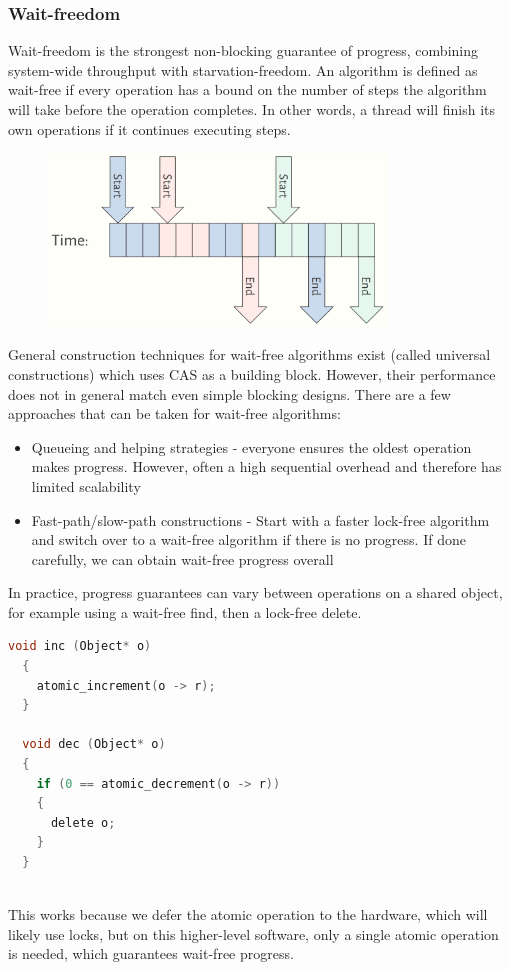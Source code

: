 \documentclass[CS4204-Notes.tex]{subfiles}
\begin{document}
\subsubsection{Wait-freedom}
Wait-freedom is the strongest non-blocking guarantee of progress, combining system-wide throughput with starvation-freedom. An algorithm is defined as wait-free if every operation has a bound on the number of steps the algorithm will take before the operation completes. In other words, a thread will finish its own operations if it continues executing steps.
\begin{figure}[H]
  \centering
  \includegraphics[width=0.8\textwidth, keepaspectratio]{imgs/wait-free.png}
\end{figure}
\noindent
General construction techniques for wait-free algorithms exist (called universal constructions) which uses CAS as a building block. However, their performance does not in general match even simple blocking designs. There are a few approaches that can be taken for wait-free algorithms:
\begin{itemize}
\item Queueing and helping strategies - everyone ensures the oldest operation makes progress. However, often a high sequential overhead and therefore has limited scalability
\item Fast-path/slow-path constructions - Start with a faster lock-free algorithm and switch over to a wait-free algorithm if there is no progress. If done carefully, we can obtain wait-free progress overall
\end{itemize}
In practice, progress guarantees can vary between operations on a shared object, for example using a wait-free find, then a lock-free delete.
\begin{lstlisting}[caption={Wait-free using atomic increment}, language=C]
  void inc (Object* o)
  {
    atomic_increment(o -> r);
  }

  void dec (Object* o)
  {
    if (0 == atomic_decrement(o -> r))
    {
      delete o;
    }
  }
  
\end{lstlisting}
This works because we defer the atomic operation to the hardware, which will likely use locks, but on this higher-level software, only a single atomic operation is needed, which guarantees wait-free progress.
\end{document}
